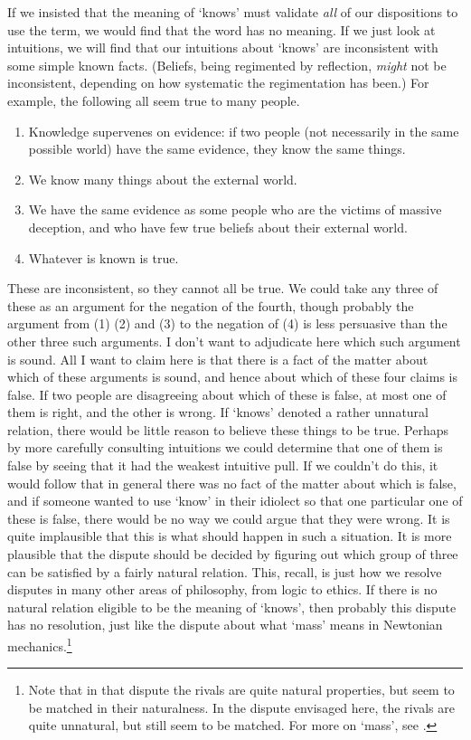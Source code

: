 If we insisted that the meaning of `knows' must validate \textit{all} of our dispositions to use the term, we would find that the word has no meaning. If we just look at intuitions, we will find that our intuitions about `knows' are inconsistent with some simple known facts. (Beliefs, being regimented by reflection, \textit{might }not be inconsistent, depending on how systematic the regimentation has been.) For example, the following all seem true to many people.

\begin{enumerate}
\renewcommand{\labelenumi}{(\arabic{enumi})}
\item Knowledge supervenes on evidence: if two people (not necessarily in the same possible world) have the same evidence, they know the same things.
\item We know many things about the external world.
\item We have the same evidence as some people who are the victims of massive deception, and who have few true beliefs about their external world.
\item Whatever is known is true.
\end{enumerate}

\noindent These are inconsistent, so they cannot all be true. We could take any three of these as an argument for the negation of the fourth, though probably the argument from (1) (2) and (3) to the negation of (4) is less persuasive than the other three such arguments. I don't want to adjudicate here which such argument is sound. All I want to claim here is that there is a fact of the matter about which of these arguments is sound, and hence about which of these four claims is false. If two people are disagreeing about which of these is false, at most one of them is right, and the other is wrong. If `knows' denoted a rather unnatural relation, there would be little reason to believe these things to be true. Perhaps by more carefully consulting intuitions we could determine that one of them is false by seeing that it had the weakest intuitive pull. If we couldn't do this, it would follow that in general there was no fact of the matter about which is false, and if someone wanted to use `know' in their idiolect so that one particular one of these is false, there would be no way we could argue that they were wrong. It is quite implausible that this is what should happen in such a situation. It is more plausible that the dispute should be decided by figuring out which group of three can be satisfied by a fairly natural relation. This, recall, is just how we resolve disputes in many other areas of philosophy, from logic to ethics. If there is no natural relation eligible to be the meaning of `knows', then probably this dispute has no resolution, just like the dispute about what `mass' means in Newtonian mechanics.\footnote{Note that in that dispute the rivals are quite natural properties, but seem to be matched in their naturalness. In the dispute envisaged here, the rivals are quite unnatural, but still seem to be matched. For more on `mass', see \citet{Field1973}.}

